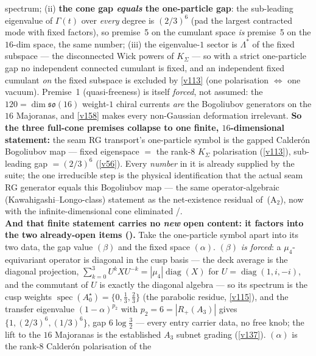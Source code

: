 \documentclass[11pt,a4paper]{article}
\begin{document}
\begin{keybox}
spectrum; (ii) \textbf{the cone gap \emph{equals} the one-particle gap}: the sub-leading eigenvalue of
$\Gamma(t)$ over \emph{every} degree is $(2/3)^6$ (pad the largest contracted mode with fixed factors), so
premise~5 on the cumulant space \emph{is} premise~5 on the $16$-dim space, the same number; (iii) the
eigenvalue-$1$ sector is $\Lambda^{*}$ of the fixed subspace --- the disconnected Wick powers of $K_\Sigma$
--- so with a strict one-particle gap no independent connected cumulant is fixed, and an independent fixed
cumulant \emph{on} the fixed subspace is excluded by \vref{v113} (one polarisation $\Leftrightarrow$ one
vacuum). Premise~1 (quasi-freeness) is itself \emph{forced}, not assumed: the $120=\dim\mathfrak{so}(16)$
weight-$1$ chiral currents \emph{are} the Bogoliubov generators on the $16$ Majoranas, and \vref{v158}
makes every non-Gaussian deformation irrelevant. \textbf{So the three full-cone premises collapse to one
finite, $16$-dimensional statement:} the seam RG transport's one-particle symbol is the gapped Calder\'on
Bogoliubov map --- fixed eigenspace $=$ the rank-$8$ $K_\Sigma$ polarisation (\vref{v113}), sub-leading gap
$=(2/3)^6$ (\vref{v56}). Every \emph{number} in it is already supplied by the suite; the one irreducible
step is the physical identification that the actual seam RG generator equals this Bogoliubov map --- the
same operator-algebraic (Kawahigashi--Longo-class) statement as the net-existence residual of~(A$_2$), now
with the infinite-dimensional cone eliminated \mE/\mO.
\smallskip\\
\noindent\textbf{And that finite statement carries no \emph{new} open content: it factors into the two
already-open items ().} Take the one-particle symbol apart
into its two data, the gap value $(\beta)$ and the fixed space $(\alpha)$. $(\beta)$ \emph{is forced}: a
$\mu_4$-equivariant operator is diagonal in the cusp basis --- the deck average is the diagonal projection,
$\sum_{k=0}^{3}U^kXU^{-k}=|\mu_4|\operatorname{diag}(X)$ for $U=\operatorname{diag}(1,i,-i)$, and the
commutant of $U$ is exactly the diagonal algebra --- so its spectrum is the cusp weights
$\operatorname{spec}(A_0^\star)=\{0,\tfrac13,\tfrac23\}$ (the parabolic residue, \vref{v115}), and the
transfer eigenvalue $(1{-}\alpha)^{p_2}$ with $p_2{=}6{=}|R_+(A_3)|$ gives $\{1,(2/3)^6,(1/3)^6\}$, gap
$6\log\tfrac32$ --- every entry carrier data, no free knob; the lift to the $16$ Majoranas is the
established $A_3$ subnet grading (\vref{v137}). $(\alpha)$ is the rank-$8$ Calder\'on polarisation of the

\end{keybox}
\end{document}
